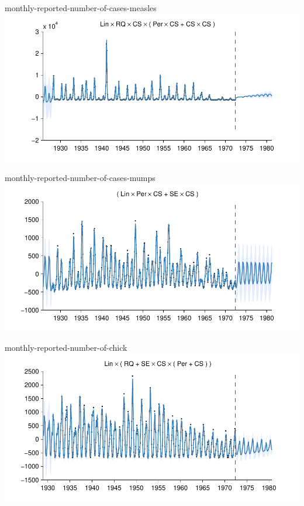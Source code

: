     
\begin{frame}{monthly-reported-number-of-cases-measles}
  \center
  \includegraphics[width=1.0\textwidth]{figures/monthly-reported-number-of-cases-measles/monthly-reported-number-of-cases-measles_all}
\end{frame}  


    
\begin{frame}{monthly-reported-number-of-cases-mumps}
  \center
  \includegraphics[width=1.0\textwidth]{figures/monthly-reported-number-of-cases-mumps/monthly-reported-number-of-cases-mumps_all}
\end{frame}  


    
\begin{frame}{monthly-reported-number-of-chick}
  \center
  \includegraphics[width=1.0\textwidth]{figures/monthly-reported-number-of-chick/monthly-reported-number-of-chick_all}
\end{frame}  


